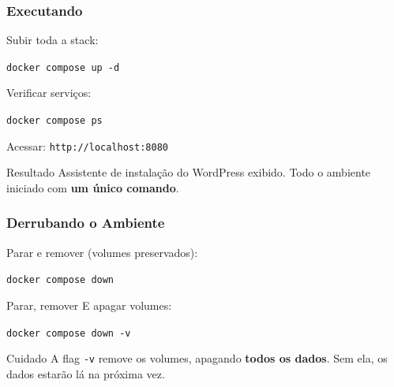 \begin{frame}
  \frametitle{Executando}
  Subir toda a stack:

  \vspace{0.3em}
  \texttt{docker compose up -d}

  \vspace{0.5em}
  Verificar serviços:

  \vspace{0.3em}
  \texttt{docker compose ps}

  \vspace{0.5em}
  Acessar: \texttt{http://localhost:8080}

  \vspace{0.5em}
  \begin{block}{Resultado}
    Assistente de instalação do WordPress exibido.
    Todo o ambiente iniciado com \textbf{um único comando}.
  \end{block}
\end{frame}

\begin{frame}
  \frametitle{Derrubando o Ambiente}
  Parar e remover (volumes preservados):

  \vspace{0.3em}
  \texttt{docker compose down}

  \vspace{0.8em}
  Parar, remover E apagar volumes:

  \vspace{0.3em}
  \texttt{docker compose down -v}

  \vspace{0.8em}
  \begin{alertblock}{Cuidado}
    A flag \texttt{-v} remove os volumes, apagando \textbf{todos os dados}.
    Sem ela, os dados estarão lá na próxima vez.
  \end{alertblock}
\end{frame}
